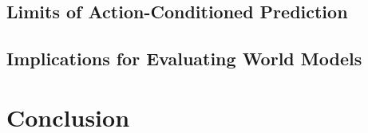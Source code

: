 \documentclass[10pt,twocolumn]{article}
\begin{document}

\subsection{Limits of Action-Conditioned Prediction}


\subsection{Implications for Evaluating World Models}


\section{Conclusion}




\end{document}
